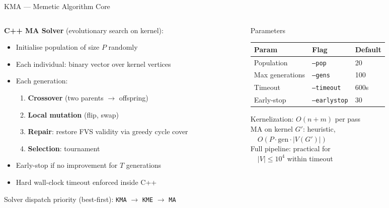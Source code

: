 \documentclass[aspectratio=169,10pt]{beamer}
\renewcommand{\footnotesize}{\tiny}
\begin{document}
\begin{frame}{KMA — Memetic Algorithm Core}
  \begin{columns}[T]
    \begin{column}{0.50\textwidth}
      \textbf{C++ MA Solver} (evolutionary search on kernel):
      \begin{itemize}\setlength\itemsep{2pt}
        \item Initialise population of size $P$ randomly
        \item Each individual: binary vector over kernel vertices
        \item Each generation:
          \begin{enumerate}\setlength\itemsep{1pt}
            \item \textbf{Crossover} (two parents $\to$ offspring)
            \item \textbf{Local mutation} (flip, swap)
            \item \textbf{Repair}: restore FVS validity via greedy cycle cover
            \item \textbf{Selection}: tournament
          \end{enumerate}
        \item Early-stop if no improvement for $T$ generations
        \item Hard wall-clock timeout enforced inside C++
      \end{itemize}
      \vspace{4pt}
      Solver dispatch priority (best-first):
      \texttt{KMA} $\to$ \texttt{KME} $\to$ \texttt{MA}
    \end{column}
    \begin{column}{0.46\textwidth}
      \begin{block}{Parameters}
        \begin{tabular}{lll}
          \toprule
          Param & Flag & Default\\
          \midrule
          Population & \texttt{--pop} & 20\\
          Max generations & \texttt{--gens} & 100\\
          Timeout & \texttt{--timeout} & 600s\\
          Early-stop & \texttt{--earlystop} & 30\\
          \bottomrule
        \end{tabular}
      \end{block}
      \vspace{6pt}
      \begin{tcolorbox}[algbox,title=Complexity Note]
        \footnotesize
        Kernelization: $O(n+m)$ per pass\\
        MA on kernel $G'$: heuristic,\\
        ~~$O(P \cdot \text{gen} \cdot |V(G')|)$\\
        Full pipeline: practical for\\
        ~~$|V| \le 10^4$ within timeout
      \end{tcolorbox}
    \end{column}
  \end{columns}
\end{frame}
\end{document}
